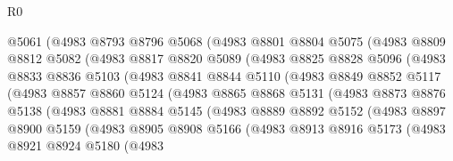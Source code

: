 \begin{lexlean}{R0}
\begin{coremodule}
              @5061
              (@4983
                @8793
                @8796
                @5068
                (@4983
                  @8801
                  @8804
                  @5075
                  (@4983
                    @8809
                    @8812
                    @5082
                    (@4983
                      @8817
                      @8820
                      @5089
                      (@4983
                        @8825
                        @8828
                        @5096
                        (@4983
                          @8833
                          @8836
                          @5103
                          (@4983
                            @8841
                            @8844
                            @5110
                            (@4983
                              @8849
                              @8852
                              @5117
                              (@4983
                                @8857
                                @8860
                                @5124
                                (@4983
                                  @8865
                                  @8868
                                  @5131
                                  (@4983
                                    @8873
                                    @8876
                                    @5138
                                    (@4983
                                      @8881
                                      @8884
                                      @5145
                                      (@4983
                                        @8889
                                        @8892
                                        @5152
                                        (@4983
                                          @8897
                                          @8900
                                          @5159
                                          (@4983
                                            @8905
                                            @8908
                                            @5166
                                            (@4983
                                              @8913
                                              @8916
                                              @5173
                                              (@4983
                                                @8921
                                                @8924
                                                @5180
                                                (@4983

\end{coremodule}
\end{lexlean}
